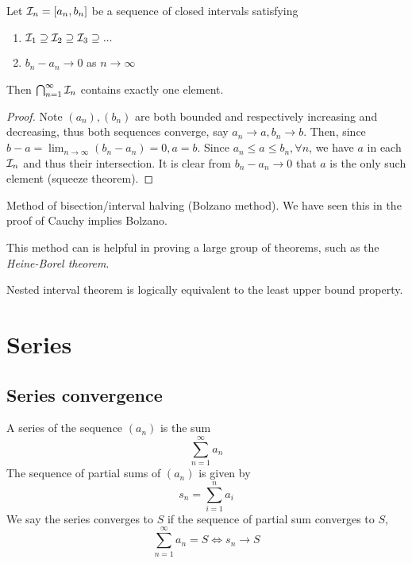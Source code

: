 \documentclass[11pt]{article}
\begin{document}
\begin{theorem}
  Let \(\cal{I}_n=[a_n,b_n]\) be a sequence of closed intervals satisfying
  \begin{enumerate}
    \item \(\cal{I}_1\supseteq\cal{I}_2\supseteq\cal{I}_3\supseteq...\)
    \item \(b_n-a_n\to 0\) as \(n\to\infty\)
  \end{enumerate}
  Then \(\bigcap_{n=1}^\infty \cal{I}_n\) contains exactly one element.
\end{theorem}
\begin{proof}
  Note \((a_n),(b_n)\) are both bounded and respectively increasing and decreasing, thus both sequences converge, say \(a_n\to a,b_n\to b\). Then, since \(b-a=\lim_{n\to\infty}(b_n-a_n)=0, a=b\). Since \(a_n\leq a\leq b_n,\forall n\), we have \(a\) in each \(\cal{I}_n\) and thus their intersection. It is clear from \(b_n-a_n\to 0\) that \(a\) is the only such element (squeeze theorem).
\end{proof}
\begin{procedure}
  Method of bisection/interval halving (Bolzano method). We have seen this in the proof of Cauchy implies Bolzano.

\end{procedure}
This method can is helpful in proving a large group of theorems, such as the \emph{Heine-Borel theorem}.

\begin{theorem}
  Nested interval theorem is logically equivalent to the least upper bound property.
\end{theorem}

\begin{problem}
  
\end{problem}

\section{Series}
\subsection{Series convergence}
\begin{definition}
  A series of the sequence \((a_n)\) is the sum
  \[\sum_{n=1}^\infty a_n\]
  The sequence of partial sums of \((a_n)\) is given by
  \[s_n=\sum_{i=1}^n a_i\]
  We say the series converges to \(S\) if the sequence of partial sum converges to \(S\),
  \[\sum_{n=1}^\infty a_n=S \iff s_n\to S\]
\end{definition}
\end{document}
